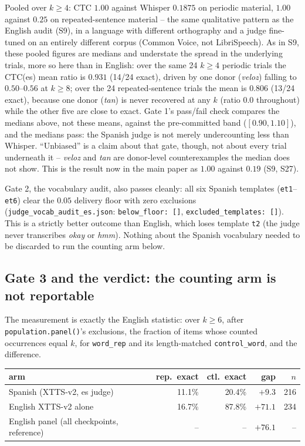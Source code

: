 \documentclass[11pt]{article}
\begin{document}
\noindent Pooled over $k{\ge}4$: CTC $1.00$ against Whisper $0.1875$ on
periodic material, $1.00$ against $0.25$ on repeated-sentence material -- the
same qualitative pattern as the English audit (S9), in a language with
different orthography and a judge fine-tuned on an entirely different corpus
(Common Voice, not LibriSpeech). As in S9, these pooled figures are medians
and understate the spread in the underlying trials, more so here than in
English: over the same 24 $k\ge4$ periodic trials the CTC(es) mean ratio is
$0.931$ (14/24 exact), driven by one donor (\emph{veloz}) falling to
$0.50$--$0.56$ at $k\ge8$; over the 24 repeated-sentence trials the mean is
$0.806$ (13/24 exact), because one donor (\emph{tan}) is never recovered at
any $k$ (ratio $0.0$ throughout) while the other five are close to exact.
Gate 1's pass/fail check compares the medians above, not these means, against
the pre-committed band ($[0.90,1.10]$), and the medians pass: the Spanish
judge is not merely undercounting less than Whisper. ``Unbiased'' is a claim
about that gate, though, not about every trial underneath it -- \emph{veloz}
and \emph{tan} are donor-level counterexamples the median does not show. This
is the result now in the main paper as $1.00$ against $0.19$ (S9, S27).

Gate 2, the vocabulary audit, also passes cleanly: all six Spanish templates
(\texttt{et1}--\texttt{et6}) clear the $0.05$ delivery floor with zero
exclusions (\texttt{judge\_vocab\_audit\_es.json}: \texttt{below\_floor: []},
\texttt{excluded\_templates: []}). This is a strictly better outcome than
English, which loses template \texttt{t2} (the judge never transcribes
\emph{okay} or \emph{hmm}). Nothing about the Spanish vocabulary needed to be
discarded to run the counting arm below.

\subsection{Gate 3 and the verdict: the counting arm is not reportable}

The measurement is exactly the English statistic: over $k\ge6$, after
\texttt{population.panel()}'s exclusions, the fraction of items whose counted
occurrences equal $k$, for \texttt{word\_rep} and its length-matched
\texttt{control\_word}, and the difference.

\begin{center}
\begin{tabular}{@{}lrrrr@{}}
\toprule
arm & rep.\ exact & ctl.\ exact & gap & $n$ \\
\midrule
Spanish (XTTS-v2, es judge)   & 11.1\% & 20.4\% & $+9.3$  & 216 \\
English XTTS-v2 alone         & 16.7\% & 87.8\% & $+71.1$ & 234 \\
English panel (all checkpoints, reference) & -- & -- & $+76.1$ & -- \\
\bottomrule
\end{tabular}
\end{center}
\end{document}
